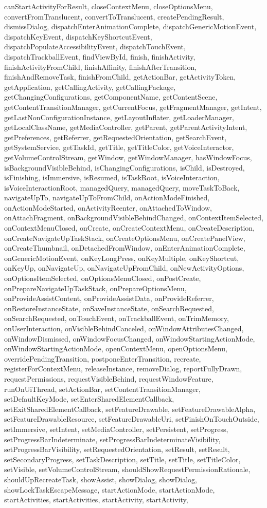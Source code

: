 canStartActivityForResult, closeContextMenu, closeOptionsMenu, convertFromTranslucent, convertToTranslucent, createPendingResult, dismissDialog, dispatchEnterAnimationComplete, dispatchGenericMotionEvent, dispatchKeyEvent, dispatchKeyShortcutEvent, dispatchPopulateAccessibilityEvent, dispatchTouchEvent, dispatchTrackballEvent, findViewById, finish, finishActivity, finishActivityFromChild, finishAffinity, finishAfterTransition, finishAndRemoveTask, finishFromChild, getActionBar, getActivityToken, getApplication, getCallingActivity, getCallingPackage, getChangingConfigurations, getComponentName, getContentScene, getContentTransitionManager, getCurrentFocus, getFragmentManager, getIntent, getLastNonConfigurationInstance, getLayoutInflater, getLoaderManager, getLocalClassName, getMediaController, getParent, getParentActivityIntent, getPreferences, getReferrer, getRequestedOrientation, getSearchEvent, getSystemService, getTaskId, getTitle, getTitleColor, getVoiceInteractor, getVolumeControlStream, getWindow, getWindowManager, hasWindowFocus, isBackgroundVisibleBehind, isChangingConfigurations, isChild, isDestroyed, isFinishing, isImmersive, isResumed, isTaskRoot, isVoiceInteraction, isVoiceInteractionRoot, managedQuery, managedQuery, moveTaskToBack, navigateUpTo, navigateUpToFromChild, onActionModeFinished, onActionModeStarted, onActivityReenter, onAttachedToWindow, onAttachFragment, onBackgroundVisibleBehindChanged, onContextItemSelected, onContextMenuClosed, onCreate, onCreateContextMenu, onCreateDescription, onCreateNavigateUpTaskStack, onCreateOptionsMenu, onCreatePanelView, onCreateThumbnail, onDetachedFromWindow, onEnterAnimationComplete, onGenericMotionEvent, onKeyLongPress, onKeyMultiple, onKeyShortcut, onKeyUp, onNavigateUp, onNavigateUpFromChild, onNewActivityOptions, onOptionsItemSelected, onOptionsMenuClosed, onPostCreate, onPrepareNavigateUpTaskStack, onPrepareOptionsMenu, onProvideAssistContent, onProvideAssistData, onProvideReferrer, onRestoreInstanceState, onSaveInstanceState, onSearchRequested, onSearchRequested, onTouchEvent, onTrackballEvent, onTrimMemory, onUserInteraction, onVisibleBehindCanceled, onWindowAttributesChanged, onWindowDismissed, onWindowFocusChanged, onWindowStartingActionMode, onWindowStartingActionMode, openContextMenu, openOptionsMenu, overridePendingTransition, postponeEnterTransition, recreate, registerForContextMenu, releaseInstance, removeDialog, reportFullyDrawn, requestPermissions, requestVisibleBehind, requestWindowFeature, runOnUiThread, setActionBar, setContentTransitionManager, setDefaultKeyMode, setEnterSharedElementCallback, setExitSharedElementCallback, setFeatureDrawable, setFeatureDrawableAlpha, setFeatureDrawableResource, setFeatureDrawableUri, setFinishOnTouchOutside, setImmersive, setIntent, setMediaController, setPersistent, setProgress, setProgressBarIndeterminate, setProgressBarIndeterminateVisibility, setProgressBarVisibility, setRequestedOrientation, setResult, setResult, setSecondaryProgress, setTaskDescription, setTitle, setTitle, setTitleColor, setVisible, setVolumeControlStream, shouldShowRequestPermissionRationale, shouldUpRecreateTask, showAssist, showDialog, showDialog, showLockTaskEscapeMessage, startActionMode, startActionMode, startActivities, startActivities, startActivity, startActivity, 